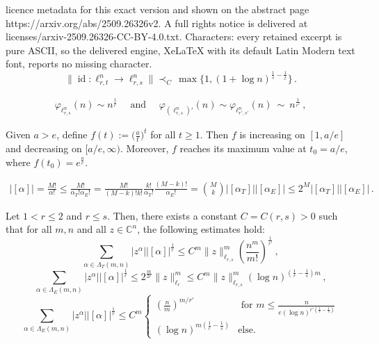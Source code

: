 \documentclass[10pt,a4paper]{amsart}
\DeclareMathOperator{\id}{\mathrm{id}}
\begin{document}
licence metadata for this exact version and shown on the abstract page https://arxiv.org/abs/2509.26326v2. A full rights notice is delivered at licenses/arxiv-2509.26326-CC-BY-4.0.txt. Characters: every retained excerpt is pure ASCII, so the delivered engine, XeLaTeX with its default Latin Modern text font, reports no missing character.
\begin{equation}\label{eq: norm identity lorentz}
\big\|{\id} \colon \ell_{r,t}^n \to \ell_{r,s}^n\big\| \prec_C\, \max\big\{1,(1 + \log n)^{\frac{1}{s}-\frac{1}{t}}\big\}\,.
\end{equation}

\begin{align} \label{fundfunc}
\varphi_{\ell_{r,s}^n}(n) \sim n^{\frac{1}{r}} \,\,\,\,\,\,\,\,
\text{and} \,\,\,\,\,\,\,\,
\varphi_{(\ell_{r,s}^n)'}(n) \sim \varphi_{\ell_{r',s'}^n}(n)~\sim~n^{\frac{1}{r'}}\,,
\end{align}

\begin{remark} \label{rem: bound for n/klog(n)}
Given $a>e$, define $f(t) := \big(\frac{a}{t}\big)^t$ for all $t\geq 1$. Then $f$ is increasing on $[1, a/e]$
and decreasing on $[a/e, \infty)$.  Moreover, $f$ reaches its maximum value at $t_0 = a/e$, where $f(t_0)= e^{\frac{a}{e}}$.
\end{remark}

\begin{align}\label{eq: cardinality decomposition even-tetra}
|[\alpha]| = \frac{M!}{\alpha!} \le \frac{M!}{\alpha_T! \alpha_E!} = \frac{M!}{(M-k)! k!} \frac{k!}{\alpha_T!} \frac{(M-k)!}{\alpha_E!}
=  \binom{M}{k} |[\alpha_T]||[\alpha_E]| \le 2^M |[\alpha_T]||[\alpha_E]|\,.
\end{align}

\begin{lemma} \label{3 cases}
Let $1<r\leq 2$ and $r\leq s$. Then, there exists a constant $C=C(r,s)>0$ such that for all $m,n$ and all $z \in \mathbb{C}^n$,  the following estimates hold{\rm:}
\begin{equation} \label{estimate1}
\sum_{\alpha \in \Lambda_T(m,n)} |z^\alpha| |[\alpha]|^{\frac{1}{r}}  \le C^m  \| z \|_{\ell_{r,s}}^m \left(\frac{n^m}{m!}\right)^{\frac{1}{r'}}\,,
\end{equation}
\begin{equation} \label{estimate2}
\sum_{\alpha \in \Lambda_E(m,n)} |z^\alpha| |[\alpha]|^{\frac{1}{r}}
\le 2^{\frac{m}{2r}}\| z \|_{\ell_r}^m  \le C^m  \| z \|_{\ell_{r,s}}^m (\log n)^{(\frac{1}{r}-\frac{1}{s})m}\,,
\end{equation}
\begin{equation} \label{estimate3}
\sum_{\alpha \in \Lambda_E(m,n)} |z^\alpha| |[\alpha]|^{\frac{1}{r}}
\le C^m 
\begin{cases}
\left(\frac{n}{m}\right)^{m/r'} & \text{ for } m \le \frac{n}{e(\log n)^{r'(\frac1{r}-\frac1{s})}} \\
(\log n)^{m(\frac1{r}-\frac1{s})}  & \text{else.}
\end{cases}
\end{equation}
\end{lemma}
\end{document}
